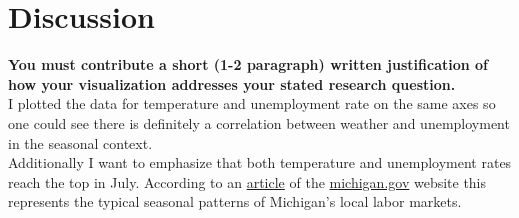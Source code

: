 \documentclass[12pt]{article}
\begin{document}
	\section{Discussion}
	\textbf{You must contribute a short (1-2 paragraph) written justification of how your visualization addresses your stated research question.}\\
	I plotted the data for temperature and unemployment rate on the same axes so one could see there is definitely a correlation between weather and unemployment in the seasonal context.\\
	Additionally I want to emphasize that both temperature and unemployment rates reach the top in July. According to an \href{https://www.michigan.gov/dtmb/0,5552,7-358--427443--,00.html}{article} of the \href{https://www.michigan.gov}{michigan.gov} website this represents the typical seasonal patterns of Michigan's local labor markets.
	
\end{document}
